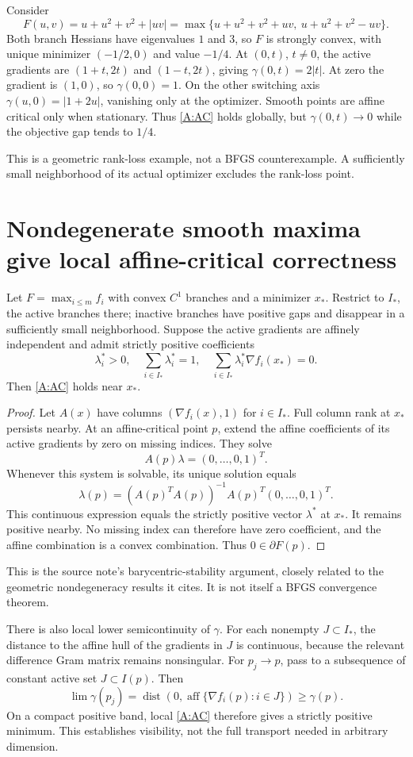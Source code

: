 \documentclass[10pt,oneside,openany]{book}
\theoremstyle{remark}\newtheorem{remark}{Remark}[chapter]
\begin{document}
Consider
\[
 F(u,v)=u+u^2+v^2+|uv|
 =\max\{u+u^2+v^2+uv,\ u+u^2+v^2-uv\}.
\]
Both branch Hessians have eigenvalues $1$ and $3$, so $F$ is strongly convex, with unique minimizer $(-1/2,0)$ and value $-1/4$. At $(0,t)$, $t\ne0$, the active gradients are $(1+t,2t)$ and $(1-t,2t)$, giving $\gamma(0,t)=2|t|$. At zero the gradient is $(1,0)$, so $\gamma(0,0)=1$. On the other switching axis $\gamma(u,0)=|1+2u|$, vanishing only at the optimizer. Smooth points are affine critical only when stationary. Thus \eqref{A:AC} holds globally, but $\gamma(0,t)\to0$ while the objective gap tends to $1/4$.

This is a geometric rank-loss example, not a BFGS counterexample. A sufficiently small neighborhood of its actual optimizer excludes the rank-loss point.

\section{Nondegenerate smooth maxima give local affine-critical correctness}
Let $F=\max_{i\le m}f_i$ with convex $C^1$ branches and a minimizer $x_*$. Restrict to $I_*$, the active branches there; inactive branches have positive gaps and disappear in a sufficiently small neighborhood. Suppose the active gradients are affinely independent and admit strictly positive coefficients
\[
 \lambda_i^*>0,\quad\sum_{i\in I_*}\lambda_i^*=1,
 \quad\sum_{i\in I_*}\lambda_i^*\nabla f_i(x_*)=0.
\]
Then \eqref{A:AC} holds near $x_*$.

\begin{proof}
Let $A(x)$ have columns $(\nabla f_i(x),1)$ for $i\in I_*$. Full column rank at $x_*$ persists nearby. At an affine-critical point $p$, extend the affine coefficients of its active gradients by zero on missing indices. They solve
\[
 A(p)\lambda=(0,\ldots,0,1)^T.
\]
Whenever this system is solvable, its unique solution equals
\[
 \lambda(p)=(A(p)^TA(p))^{-1}A(p)^T(0,\ldots,0,1)^T.
\]
This continuous expression equals the strictly positive vector $\lambda^*$ at $x_*$. It remains positive nearby. No missing index can therefore have zero coefficient, and the affine combination is a convex combination. Thus $0\in\partial F(p)$.
\end{proof}
This is the source note's barycentric-stability argument, closely related to the geometric nondegeneracy results it cites. It is not itself a BFGS convergence theorem.

There is also local lower semicontinuity of $\gamma$. For each nonempty $J\subset I_*$, the distance to the affine hull of the gradients in $J$ is continuous, because the relevant difference Gram matrix remains nonsingular. For $p_j\to p$, pass to a subsequence of constant active set $J\subset I(p)$. Then
\[
 \lim\gamma(p_j)=\operatorname{dist}(0,\operatorname{aff}\{\nabla f_i(p):i\in J\})\ge\gamma(p).
\]
On a compact positive band, local \eqref{A:AC} therefore gives a strictly positive minimum. This establishes visibility, not the full transport needed in arbitrary dimension.
\end{document}
